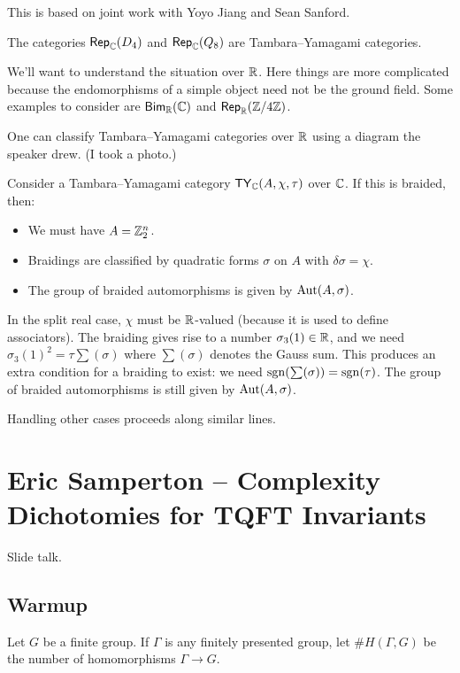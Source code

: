 \documentclass{amsart}
\begin{document}
This is based on joint work with Yoyo Jiang and Sean Sanford.

\begin{ex}
  The categories $\operatorname{\mathsf{Rep}}_{\mathbb{C}}(D_4)$ and $\operatorname{\mathsf{Rep}}_{\mathbb{C}}(Q_8)$ are Tambara--Yamagami categories.
\end{ex}

We'll want to understand the situation over $\mathbb{R}$.
Here things are more complicated because the endomorphisms of a simple object need not be the ground field.
Some examples to consider are $\operatorname{\mathsf{Bim}}_{\mathbb{R}}(\mathbb{C})$ and $\operatorname{\mathsf{Rep}}_{\mathbb{R}}(\mathbb{Z} / 4 \mathbb{Z})$.

One can classify Tambara--Yamagami categories over $\mathbb{R}$ using a diagram the speaker drew.
(I took a photo.)

Consider a Tambara--Yamagami category $\operatorname{\mathsf{TY}}_{\mathbb{C}}(A, \chi, \tau)$ over $\mathbb{C}$.
If this is braided, then:
\begin{itemize}
  \item We must have $A = \mathbb{Z}_2^n$.
  \item Braidings are classified by quadratic forms $\sigma$ on $A$ with $\delta \sigma = \chi$.
  \item The group of braided automorphisms is given by $\operatorname{Aut}(A, \sigma)$.
\end{itemize}

In the split real case, $\chi$ must be $\mathbb{R}$-valued (because it is used to define associators).
The braiding gives rise to a number $\sigma_3(1) \in \mathbb{R}$, and we need $\sigma_3(1)^2 = \tau \sum(\sigma)$ where $\sum(\sigma)$ denotes the Gauss sum.
This produces an extra condition for a braiding to exist: we need $\operatorname{sgn}(\sum(\sigma)) = \operatorname{sgn}(\tau)$.
The group of braided automorphisms is still given by $\operatorname{Aut}(A, \sigma)$.

Handling other cases proceeds along similar lines.

\section{Eric Samperton -- Complexity Dichotomies for TQFT Invariants}

Slide talk.

\subsection{Warmup}

Let $G$ be a finite group.
If $\Gamma$ is any finitely presented group, let $\#H(\Gamma, G)$ be the number of homomorphisms $\Gamma \to G$.
\end{document}
